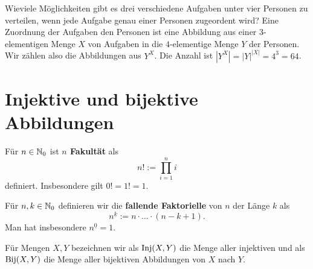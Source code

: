 \begin{bsp}
	Wieviele Möglichkeiten gibt es drei verschiedene Aufgaben unter vier Personen zu verteilen, wenn jede Aufgabe genau einer Personen zugeordent wird? Eine Zuordnung der Aufgaben den Personen ist eine Abbildung aus einer $3$-elementigen Menge $X$ von  Aufgaben in die $4$-elementige Menge $Y$ der Personen. Wir zählen also die Abbildungen aus $Y^X$. Die Anzahl ist $|Y^X| = |Y|^{|X|} = 4^3 = 64$. 
\end{bsp} 

\section{Injektive und bijektive Abbildungen} 

\begin{defn}[Fakultät]
	Für $n \in \mathbb{N}_0$ ist \textbf{$n$ Fakultät} als 
	\[n ! := \prod_{i=1}^n i
	\] definiert. Insbesondere gilt $0!=1!=1$. 
\end{defn} 

\begin{defn}
	Für $n, k \in \mathbb{N}_0$ definieren wir die \textbf{fallende Faktorielle} von $n$ der Länge $k$ als
	\[
		n^{\underline{k}} := n \cdot \ldots \cdot (n-k+1).
	\]
	Man hat insbesondere $n^{\underline{0}}=1$. 
\end{defn} 

\begin{defn}
	Für Mengen $X, Y$ bezeichnen wir als $\operatorname{Inj}(X,Y)$ die Menge aller injektiven und als $\operatorname{Bij}(X,Y)$ die Menge aller bijektiven Abbildungen von $X$ nach $Y$. 
\end{defn} 

